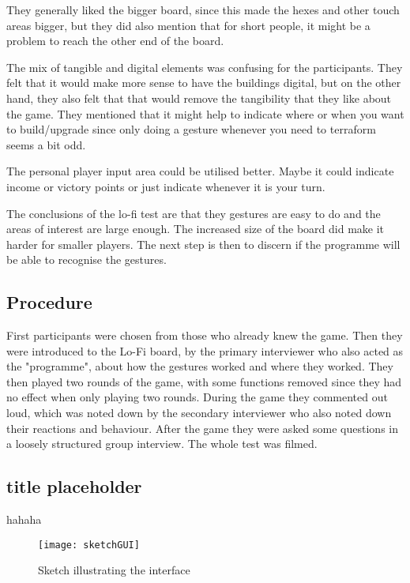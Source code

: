 They generally liked the bigger board, since this made the hexes and other touch areas bigger, but they did also mention that for short people, it might be a problem to reach the other end of the board. 

The mix of tangible and digital elements was confusing for the participants. They felt that it would make more sense to have the buildings digital, but on the other hand, they also felt that that would remove the tangibility that they like about the game. They mentioned that it might help to indicate where or when you want to build/upgrade since only doing a gesture whenever you need to terraform seems a bit odd. 

The personal player input area could be utilised better. Maybe it could indicate income or victory points or just indicate whenever it is your turn. 

The conclusions of the lo-fi test are that they gestures are easy to do and the areas of interest are large enough. The increased size of the board did make it harder for smaller players. The next step is then to discern if the programme will be able to recognise the gestures. 

\subsection{Procedure}
First participants were chosen from those who already knew the game.
Then they were introduced to the Lo-Fi board, by the primary interviewer who also acted as the "programme", about how the gestures worked and where they worked. They then played two rounds of the game, with some functions removed since they had no effect when only playing two rounds. During the game they commented out loud, which was noted down by the secondary interviewer who also noted down their reactions and behaviour. 
After the game they were asked some questions in a loosely structured group interview. 
The whole test was filmed.

\subsection{title placeholder} 
hahaha

\begin{figure}
\centering
\texttt{[image: sketchGUI]}
\caption{Sketch illustrating the interface}
\end{figure}

